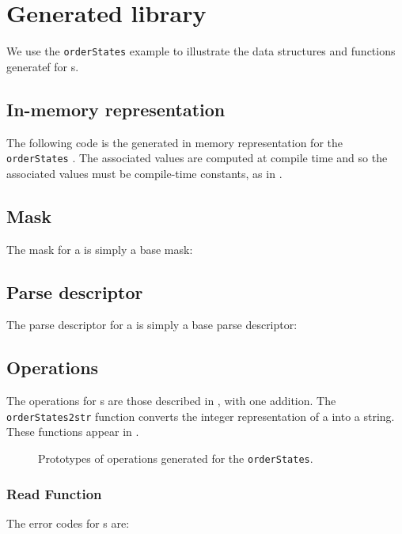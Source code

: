 \section{Generated library}
We use the \texttt{orderStates} example to illustrate the data
structures and functions generatef for \Penum{}s.
\subsection{In-memory representation}
\label{sec:enums-rep}
The following \C{} code is the generated in memory representation for
the \texttt{orderStates} \Penum{}. The associated values are computed
at \pads{} compile time and so the associated values must be
compile-time constants, as in \C{}.


\subsection{Mask}
\label{sec:enums-masks}
The mask for a \Penum{} is simply a base mask:


\subsection{Parse descriptor}
\label{sec:enums-parse-descriptors}
The parse descriptor for a \Penum{} is simply a base parse descriptor:


\subsection{Operations}
The operations for \Penum{}s are those described in
, with one addition.
The \texttt{orderStates2str} function converts the integer
representation of a \Penum{} into a \C{} string.
These functions appear in .
\begin{figure}
\caption{Prototypes of operations generated for
  the \Penum{} \texttt{orderStates}.}
\label{figure:enum-ops}
\end{figure}

\subsubsection{Read Function}
The error codes for \Penum{}s are:


